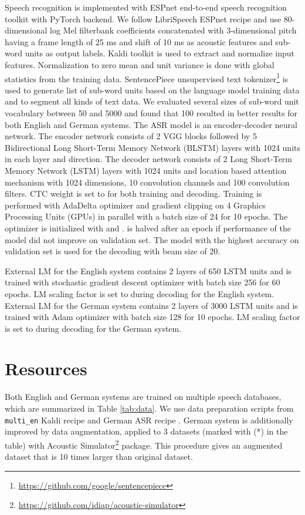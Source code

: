 \documentclass[12pt,a4paper]{article}
\begin{document}
Speech recognition is implemented with ESPnet end-to-end
speech recognition toolkit \cite{watanabe2018espnet}
with PyTorch backend.
We follow LibriSpeech ESPnet recipe and use 
80-dimensional log Mel filterbank coefficients concatenated with
3-dimensional pitch having a frame length of 25 ms and shift of 10 ms as acoustic features
and sub-word units as output labels. 
Kaldi toolkit is used to extract and normalize input features.
Normalization
to zero mean and unit variance is done with
global statistics from the training data.
SentencePiece unsupervised text tokenizer\footnote{\url{https://github.com/google/sentencepiece}} is used to
generate list of sub-word units based on the
language model training data and to segment all kinds of text data.
We evaluated several sizes of sub-word unit vocabulary
between 50 and 5000 and found that 100 resulted in better
results for both English and German systems.
The ASR model is an encoder-decoder neural network.
The encoder network consists of 2 VGG \cite{simonyan2014very} blocks followed by
5 Bidirectional Long Short-Term Memory Network (BLSTM) layers \cite{graves2005bidirectional} with 1024 units in each layer and direction.
The decoder network consists of 2 Long Short-Term Memory Network (LSTM) \cite{hochreiter1997long} layers with 1024 units
and location based attention mechanism with 1024 dimensions,
10 convolution channels and 100 convolution filters.
CTC weight  is set to  for both training
and decoding.
Training is performed with AdaDelta optimizer \cite{zeiler2012adadelta}
and gradient clipping on 4 Graphics Processing Units (GPUs) in parallel with a batch size of 24 for 10 epochs.
The optimizer is initialized with  and .
 is halved after an epoch if performance of the model
did not improve on validation set.
The model with the highest accuracy on validation set
is used for the decoding with beam size of 20. 

External LM for the English system contains 2 layers of 650 LSTM units
and is trained with stochastic gradient descent optimizer with
batch size 256 for 60 epochs.
LM scaling factor  is set to 
during decoding for the English system.
External LM for the German system contains 2 layers of 3000 LSTM units
and is trained with Adam optimizer \cite{kingma2014adam} with
batch size 128 for 10 epochs.
LM scaling factor  is set to 
during decoding for the German system.

\section{Resources}
Both English and German systems
are trained on multiple speech databases, which are summarized in
Table \ref{tab:data}.
We use data preparation scripts from \texttt{multi\_en} Kaldi recipe
and German ASR recipe \cite{milde-koehn-18-german-asr}.
German system is additionally improved by data augmentation,
applied to 3 datasets (marked with (*) in the table)
with Acoustic Simulator\footnote{\url{https://github.com/idiap/acoustic-simulator}} package.
This procedure gives an augmented dataset that is 10 times larger than original dataset.
\end{document}
